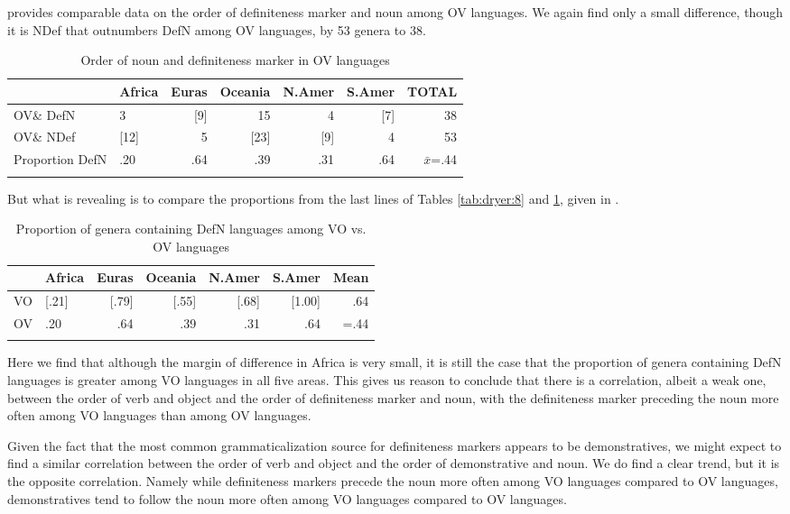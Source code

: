 \documentclass[output=paper]{langsci/langscibook}
\begin{document}
 provides comparable data on the order of definiteness marker and noun among OV languages.  We again find only a small difference, though it is NDef that outnumbers DefN among OV languages, by 53 genera to 38.

\begin{table}
\begin{tabularx}{\textwidth}{llrrrrr} 
\lsptoprule
& \bfseries Africa & \bfseries Euras & \bfseries Oceania & \bfseries N.Amer & \bfseries S.Amer & \bfseries TOTAL\\
\midrule
OV\& DefN & 3 & [9] & 15 & 4 & [7] & 38\\
OV\& NDef & [12] & 5 & [23] & [9] & 4 & 53\\
Proportion DefN & .20 & .64 & .39 & .31 & .64 & $\bar{x}$=.44\\
\lspbottomrule
\end{tabularx} 
\caption{Order of noun and definiteness marker in OV languages}
\label{tab:dryer:9}
\end{table}

But what is revealing is to compare the proportions from the last lines of Tables \ref{tab:dryer:8} and \ref{tab:dryer:9}, given in .

\begin{table}
\begin{tabularx}{\textwidth}{Xlrrrrr} 
\lsptoprule
& \bfseries Africa & \bfseries Euras & \bfseries Oceania & \bfseries N.Amer & \bfseries S.Amer & \bfseries Mean\\
\midrule 
VO & [.21] & [.79] & [.55] & [.68] & [1.00] & .64\\
OV & .20 & .64 & .39 & .31 & .64 & =.44\\
\lspbottomrule
\end{tabularx} 
\caption{\label{tab:dryer:10} Proportion of genera containing DefN languages among VO vs. OV languages}
\end{table}


Here we find that although the margin of difference in Africa is very small, it is still the case that the proportion of genera containing DefN languages is greater among VO languages in all five areas. This gives us reason to conclude that there is a correlation, albeit a weak one, between the order of verb and object and the order of definiteness marker and noun, with the definiteness marker preceding the noun more often among VO languages than among OV languages.

Given the fact that the most common grammaticalization source for definiteness markers appears to be demonstratives, we might expect to find a similar correlation between the order of verb and object and the order of demonstrative and noun. We do find a clear trend, but it is the opposite correlation. Namely while definiteness markers precede the noun more often among VO languages compared to OV languages, demonstratives tend to follow the noun more often among VO languages compared to OV languages.
\end{document}
